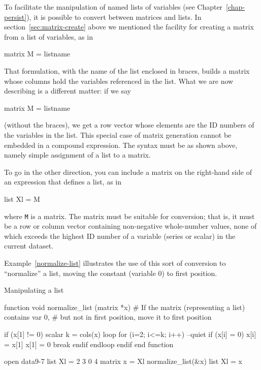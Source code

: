 To facilitate the manipulation of named lists of variables (see
Chapter~\ref{chap-persist}), it is possible to convert between
matrices and lists.  In section~\ref{sec:matrix-create} above we mentioned
the facility for creating a matrix from a list of variables, as in
%
\begin{code}
matrix M = { listname }
\end{code}
%
That formulation, with the name of the list enclosed in braces, builds
a matrix whose columns hold the variables referenced in the list.
What we are now describing is a different matter: if we say
%
\begin{code}
matrix M = listname
\end{code}
%
(without the braces), we get a row vector whose elements are
the ID numbers of the variables in the list.  This special case
of matrix generation cannot be embedded in a compound
expression.  The syntax must be as shown above, namely simple
assignment of a list to a matrix.

To go in the other direction, you can include a matrix on the
right-hand side of an expression that defines a list, as in
%
\begin{code}
list Xl = M
\end{code}
%
where \texttt{M} is a matrix.  The matrix must be suitable for
conversion; that is, it must be a row or column vector containing
non-negative whole-number values, none of which exceeds the highest ID
number of a variable (series or scalar) in the current dataset.

Example~\ref{normalize-list} illustrates the use of this sort of
conversion to ``normalize'' a list, moving the constant (variable 0)
to first position.

\begin{script}[htbp]
  \caption{Manipulating a list}
  \label{normalize-list}
\begin{scode}
function void normalize_list (matrix *x)
  # If the matrix (representing a list) contains var 0,
  # but not in first position, move it to first position

  if (x[1] != 0)
     scalar k = cols(x)
     loop for (i=2; i<=k; i++) --quiet
        if (x[i] = 0)
            x[i] = x[1]
            x[1] = 0
            break
         endif
     endloop
  endif
end function

open data9-7
list Xl = 2 3 0 4
matrix x = Xl
normalize_list(&x)
list Xl = x
\end{scode}
\end{script}


